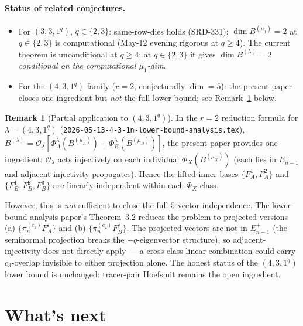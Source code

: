 \documentclass[11pt]{article}
\theoremstyle{definition}
\newtheorem{remark}[theorem]{Remark}
\begin{document}
\paragraph{Status of related conjectures.}
\begin{itemize}[leftmargin=2em,topsep=0.2em,itemsep=0.1em]
\item For $(3, 3, 1^q)$, $q \in \{2, 3\}$: same-row-dies holds
(SRD-331); $\dim B^{(\mu_1)} = 2$ at $q \in \{2, 3\}$ is computational
(May-12 evening rigorous at $q \ge 4$). The current theorem is
unconditional at $q \ge 4$; at $q \in \{2, 3\}$ it gives
$\dim B^{(\lambda)} = 2$ \emph{conditional on the computational
$\mu_1$-dim}.
\item For the $(4, 3, 1^q)$ family ($r = 2$, conjecturally $\dim = 5$):
the present paper closes one ingredient but \emph{not} the full
lower bound; see Remark~\ref{rem:431-partial} below.
\end{itemize}

\begin{remark}[Partial application to $(4, 3, 1^q)$]\label{rem:431-partial}
In the $r = 2$ reduction formula for $\lambda = (4, 3, 1^q)$
(\texttt{2026-05-13-4-3-1n-lower-bound-analysis.tex}),
$B^{(\lambda)} = \mathcal{O}_\lambda
[\Phi_A^\lambda(B^{(\mu_A)}) + \Phi_B^\lambda(B^{(\mu_B)})]$,
the present paper provides one ingredient: $\mathcal{O}_\lambda$ acts
injectively on each individual $\Phi_X(B^{(\mu_X)})$ (each lies in
$E_{n-1}^+$ and adjacent-injectivity propagates). Hence the lifted
inner bases $\{F_A^1, F_A^2\}$ and $\{F_B^1, F_B^2, F_B^3\}$ are
linearly independent within each $\Phi_X$-class.

However, this is \emph{not} sufficient to close the full
$5$-vector independence. The lower-bound-analysis paper's Theorem~3.2
reduces the problem to projected versions
(a) $\{\pi^{(c_1)}_n F_A^i\}$ and (b) $\{\pi^{(c_2)}_n F_B^j\}$. The
projected vectors are not in $E_{n-1}^+$ (the seminormal projection
breaks the $+q$-eigenvector structure), so adjacent-injectivity does
not directly apply --- a cross-class linear combination could carry
$c_3$-overlap invisible to either projection alone. The honest status
of the $(4, 3, 1^q)$ lower bound is unchanged: tracer-pair Hoefsmit
remains the open ingredient.
\end{remark}

\section{What's next}\label{sec:next}
\end{document}
